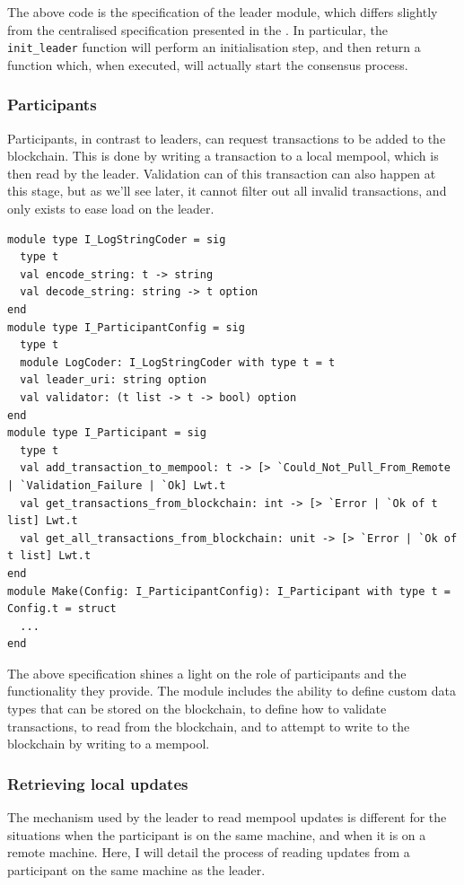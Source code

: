 \documentclass[12pt,a4paper,twoside,openright]{report}
\begin{document}
			The above code is the specification of the leader module, which differs slightly from the centralised specification presented in the .
			In particular, the \texttt{init\_leader} function will perform an initialisation step, and then return a function which, when executed, will actually start the consensus process.

			\subsubsection*{Participants}
			Participants, in contrast to leaders, can request transactions to be added to the blockchain. 
			This is done by writing a transaction to a local mempool, which is then read by the leader.
			Validation can of this transaction can also happen at this stage, but as we'll see later, it cannot filter out all invalid transactions, and only exists to ease load on the leader.\\

			\begin{lstlisting}
module type I_LogStringCoder = sig
  type t
  val encode_string: t -> string
  val decode_string: string -> t option
end
module type I_ParticipantConfig = sig
  type t
  module LogCoder: I_LogStringCoder with type t = t
  val leader_uri: string option
  val validator: (t list -> t -> bool) option
end
module type I_Participant = sig
  type t
  val add_transaction_to_mempool: t -> [> `Could_Not_Pull_From_Remote | `Validation_Failure | `Ok] Lwt.t
  val get_transactions_from_blockchain: int -> [> `Error | `Ok of t list] Lwt.t
  val get_all_transactions_from_blockchain: unit -> [> `Error | `Ok of t list] Lwt.t
end
module Make(Config: I_ParticipantConfig): I_Participant with type t = Config.t = struct
  ...
end
			\end{lstlisting}

			The above specification shines a light on the role of participants and the functionality they provide.
			The module includes the ability to define custom data types that can be stored on the blockchain, to define how to validate transactions, to read from the blockchain, and to attempt to write to the blockchain by writing to a mempool.

			\subsubsection*{Retrieving local updates}
			The mechanism used by the leader to read mempool updates is different for the situations when the participant is on the same machine, and when it is on a remote machine. 
			Here, I will detail the process of reading updates from a participant on the same machine as the leader.\\
\end{document}
